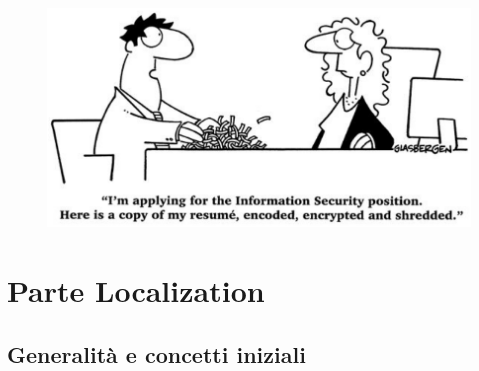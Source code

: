 \documentclass[oneside, 12pt]{extbook}
\begin{document}
\begin{figure}[!h]
	\centering
	\includegraphics[scale=0.6]{immagini/hardware/final.png}
\end{figure}

\part{Parte Localization}

\chapter{Generalità e concetti iniziali}
\end{document}
